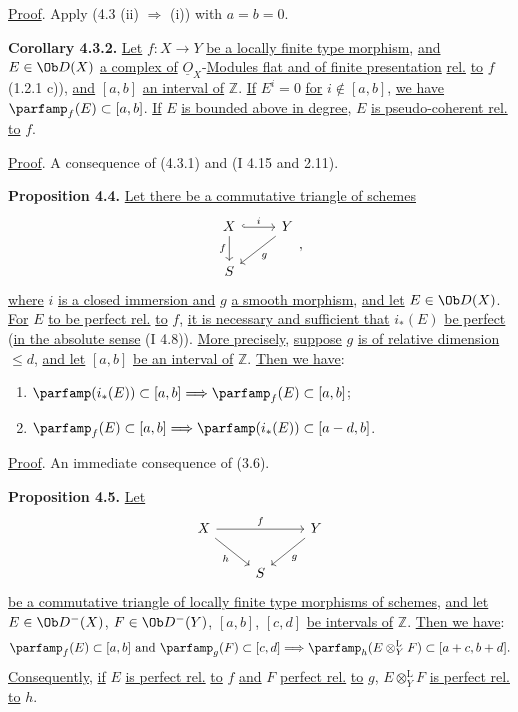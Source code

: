 \uline{Proof}. Apply (4.3 (ii) \(\Longrightarrow\) (i)) with \(a=b=0\).

\textbf{Corollary 4.3.2.} \uline{Let} \(f:X\to Y\) \uline{be a locally finite type morphism}, \uline{and} \(E\in\Ob D(X)\) \uline{a complex of} \(\underline{O}_X\)-\uline{Modules flat and of finite presentation} \uline{rel.} \uline{to} \(f\) (1.2.1 c)), \uline{and} \([a,b]\) \uline{an interval of} \(\mathbb Z\). \uline{If} \(E^i=0\) \uline{for} \(i\notin[a,b]\), \uline{we have} \(\parfamp_f(E)\subset[a,b]\). \uline{If} \(E\) \uline{is bounded above in degree}, \(E\) \uline{is pseudo-coherent rel.} \uline{to} \(f\).

\uline{Proof}. A consequence of (4.3.1) and (I 4.15 and 2.11).

\textbf{Proposition 4.4.} \uline{Let there be a commutative triangle of schemes}
\[
\begin{tikzcd}
X \arrow[r,hook,"i"] \arrow[d,"f"'] & Y \arrow[dl,"g"]\\
S &
\end{tikzcd},
\]
%
\uline{where} \(i\) \uline{is a closed immersion and} \(g\) \uline{a smooth morphism}, \uline{and let} \(E\in\Ob D(X)\). \uline{For} \(E\) \uline{to be perfect rel.} \uline{to} \(f\), \uline{it is necessary and sufficient that} \(i_*(E)\) \uline{be perfect} (\uline{in the absolute sense} (I 4.8)). \uline{More precisely}, \uline{suppose} \(g\) \uline{is of relative dimension} \(\leq d\), \uline{and let} \([a,b]\) \uline{be an interval of} \(\mathbb Z\). \uline{Then we have}:
\begin{enumerate}[label=(\roman*)]
\item \(\parfamp(i_*(E))\subset[a,b]\Longrightarrow\parfamp_f(E)\subset[a,b]\);
\item \(\parfamp_f(E)\subset[a,b]\Longrightarrow\parfamp(i_*(E))\subset[a-d,b]\).
\end{enumerate}

\uline{Proof}. An immediate consequence of (3.6).

\textbf{Proposition 4.5.} \uline{Let}
\[
\begin{tikzcd}
X \arrow[rr,"f"] \arrow[dr,"h"'] && Y \arrow[dl,"g"]\\
& S &
\end{tikzcd}
\]
\uline{be a commutative triangle of locally finite type morphisms of schemes}, \uline{and let} \(E\in\Ob D^-(X)\), \(F\in\Ob D^-(Y)\), \([a,b]\), \([c,d]\) \uline{be intervals of} \(\mathbb Z\). \uline{Then we have}:
\[
 \parfamp_f(E)\subset[a,b]\text{ and }\parfamp_g(F)\subset[c,d]
 \Longrightarrow
 \parfamp_h(E\otimes_Y^{\mathrm L}F)
 \subset[a+c,b+d].
\]
\uline{Consequently}, \uline{if} \(E\) \uline{is perfect rel.} \uline{to} \(f\) \uline{and} \(F\) \uline{perfect rel.} \uline{to} \(g\), \(E\otimes_Y^{\mathrm L}F\) \uline{is perfect rel.} \uline{to} \(h\).

